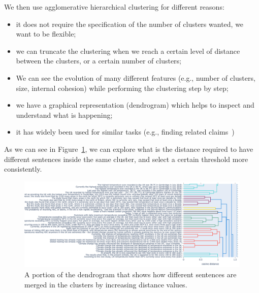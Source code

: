 We then use agglomerative hierarchical clustering for different reasons:
\begin{itemize}
    \item it does not require the specification of the number of clusters wanted, we want to be flexible;
    \item we can truncate the clustering when we reach a certain level of distance between the clusters, or a certain number of clusters;
    \item We can see the evolution of many different features (e.g., number of clusters, size, internal cohesion) while performing the clustering step by step;
    \item we have a graphical representation (dendrogram) which helps to inspect and understand what is happening;
    \item it has widely been used for similar tasks (e.g., finding related claims~\citep{almeida2020text})
\end{itemize}


As we can see in Figure~\ref{fig:dendrogram}, we can explore what is the distance required to have different sentences inside the same cluster, and select a certain threshold more consistently.
\begin{figure}[!htb]
    \centering
    \includegraphics[width=\linewidth]{figures/dendrogram.png}
    \caption{A portion of the dendrogram that shows how different sentences are merged in the clusters by increasing distance values.}
    \label{fig:dendrogram}
\end{figure}

